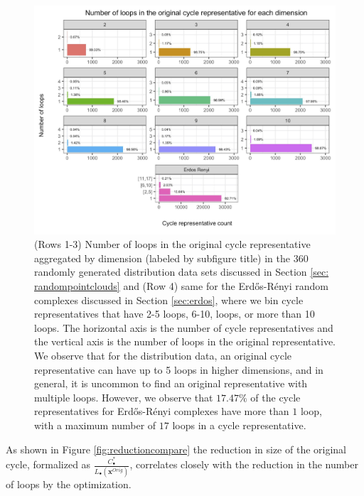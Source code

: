 \documentclass[11pt,onecolumn]{article}
\newcommand{\originalrep}{\mathbf{x}^{Orig}}
\newcommand{\fig}{Figure }
\theoremstyle{plain}
\theoremstyle{definition}
\begin{document}
 \begin{figure}[]
\begin{center}
\includegraphics[width=\textwidth]{figures/loopsbreakdown.jpg}
\end{center}
\caption{  
(Rows 1-3) Number of loops in the original cycle representative aggregated by dimension (labeled by subfigure title) in the  $360$ randomly generated distribution data sets discussed in Section \ref{sec: randompointclouds} and (Row 4) same for the  Erd\H{o}s-R\'enyi random complexes discussed in Section \ref{sec:erdos}, where we bin cycle representatives that have 2-5 loops, 6-10, loops, or more than 10 loops. The horizontal axis is the number of cycle representatives and the vertical axis is the number of loops in the original representative. We observe that for the distribution data, an original cycle representative can have up to 5 loops in higher dimensions, and in general, it is uncommon to find an original representative with multiple loops. However, we observe that $17.47\%$ of the cycle representatives for Erd\H{o}s-R\'enyi complexes have more than $1$ loop, with a maximum number of $17$ loops in a cycle representative.}
\label{fig:loopsbreakdown}
\end{figure} 



As shown in \fig \ref{fig:reductioncompare} the reduction in size of the original cycle, formalized as $\frac{C^*_\bullet}{L_\bullet(\originalrep)}$,  correlates closely with the reduction in the number of loops by the optimization.
\end{document}
